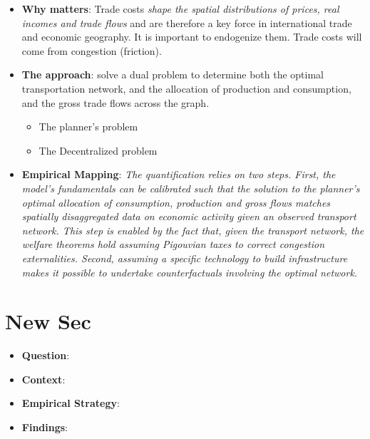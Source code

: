 \documentclass[10pt, final]{article}
\begin{document}
\begin{itemize}
	\item \textbf{Why matters}: Trade costs \textit{shape the spatial distributions of prices, real incomes and trade flows} and are therefore a key force in international trade and economic geography. It is important to endogenize them. Trade costs will come from congestion (friction).
	\item \textbf{The approach}: solve a dual problem to determine both the optimal transportation network, and the allocation of production and consumption, and the gross trade flows across the graph.
	\begin{itemize}
		\item The planner's problem
		\item The Decentralized problem
	\end{itemize}
	\item \textbf{Empirical Mapping}: \textit{The quantification relies on two steps. First, the model's fundamentals can be calibrated such that the solution to the planner's optimal allocation of consumption, production and gross flows matches spatially disaggregated data on economic activity given an observed transport network. This step is enabled by the fact that, given the transport network, the welfare theorems hold assuming Pigouvian taxes to correct congestion externalities. Second, assuming a specific technology to build infrastructure makes it possible to undertake counterfactuals involving the optimal network.}
\end{itemize}




\section{New Sec} %
\label{sec:new_sec}
\begin{itemize}
	\item \textbf{Question}:
	\item \textbf{Context}:
	\item \textbf{Empirical Strategy}:
	\item \textbf{Findings}:
\end{itemize}
\end{document}
